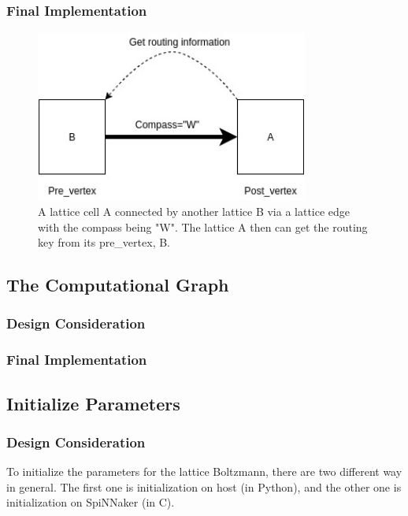 \subsubsection{Final Implementation}
\begin{figure}[!tb]
   \centering
       \includegraphics[width=0.8\textwidth]{figures/edge.jpg}
       \caption{A lattice cell A connected by another lattice B via a lattice edge with the compass being "W". The lattice A then can get the routing key from its pre\_vertex, B.}
       \label{fig:edge}
\end{figure}

\subsection{The Computational Graph} \label{sec:tcg} %
\subsubsection{Design Consideration}
\subsubsection{Final Implementation}


\subsection{Initialize Parameters} \label{sec:ip}
\subsubsection{Design Consideration}
To initialize the parameters for the lattice Boltzmann, there are two different way in general. The first one is initialization on host (in Python), and the other one is initialization on SpiNNaker (in C).
